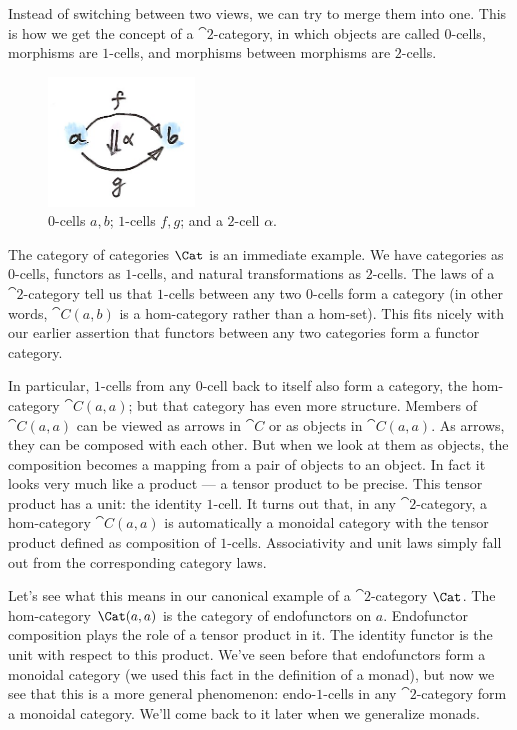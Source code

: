 Instead of switching between two views, we can try to merge them into
one. This is how we get the concept of a $\cat{2}$-category, in which objects
are called $0$-cells, morphisms are $1$-cells, and morphisms between
morphisms are $2$-cells.

\begin{figure}[H]
\centering
\includegraphics[width=1.53125in]{images/twocat.png}
\caption{$0$-cells $a, b$; $1$-cells $f, g$; and a $2$-cell $\alpha$.}
\end{figure}

\noindent
The category of categories $\Cat$ is an immediate example. We have
categories as $0$-cells, functors as $1$-cells, and natural transformations
as $2$-cells. The laws of a $\cat{2}$-category tell us that $1$-cells between any
two $0$-cells form a category (in other words, $\cat{C}(a, b)$ is a
hom-category rather than a hom-set). This fits nicely with our earlier
assertion that functors between any two categories form a functor
category.

In particular, $1$-cells from any $0$-cell back to itself also form a
category, the hom-category $\cat{C}(a, a)$; but that category has even
more structure. Members of $\cat{C}(a, a)$ can be viewed as arrows in
$\cat{C}$ or as objects in $\cat{C}(a, a)$. As arrows, they can be
composed with each other. But when we look at them as objects, the
composition becomes a mapping from a pair of objects to an object. In
fact it looks very much like a product --- a tensor product to be
precise. This tensor product has a unit: the identity $1$-cell. It turns
out that, in any $\cat{2}$-category, a hom-category $\cat{C}(a, a)$ is
automatically a monoidal category with the tensor product defined as
composition of $1$-cells. Associativity and unit laws simply fall out from
the corresponding category laws.

Let's see what this means in our canonical example of a $\cat{2}$-category
$\Cat$. The hom-category $\Cat(a, a)$ is the category of
endofunctors on $a$. Endofunctor composition plays the role of a
tensor product in it. The identity functor is the unit with respect to
this product. We've seen before that endofunctors form a monoidal
category (we used this fact in the definition of a monad), but now we
see that this is a more general phenomenon: endo-$1$-cells in any
$\cat{2}$-category form a monoidal category. We'll come back to it later when we
generalize monads.

